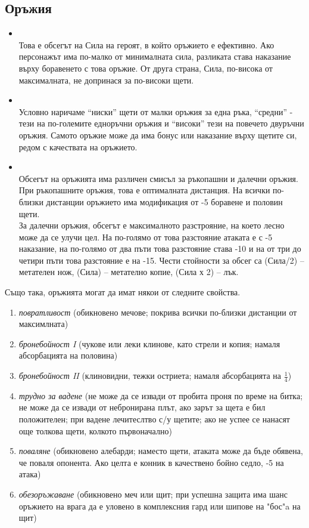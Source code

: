 \subsection{Оръжия}
\begin{itemize}
\item {} \\
Това е обсегът на Сила на героят, в който оръжието е ефективно.
Ако персонажът има по-малко от минималната сила, разликата става наказание върху боравенето с това оръжие.
От друга страна, Сила, по-висока от максималната, не допринася за по-високи щети.
\item {} \\
Условно наричаме “ниски” щети от малки оръжия за една ръка, “средни” - тези на по-големите
едноръчни оръжия и “високи” тези на повечето двуръчни оръжия.
Самото оръжие може да има бонус или наказание върху щетите си, редом с качествата на оръжието.
\item {} \\
Обсегът на оръжията има различен смисъл за ръкопашни и далечни оръжия.
При ръкопашните оръжия, това е оптималната дистанция.
На всички по-близки дистанции оръжието има модификация от -5 боравене и половин щети.
\\
За далечни оръжия, обсегът е максималното разстрояние, на което лесно може да се улучи цел.
На по-голямо от това разстояние атаката е с -5 наказание, на по-голямо от два пъти това разстояние става -10 и на от три до четири пъти това разстояние е на -15.
Чести стойности за обсег са (Сила/2) – метателен нож, (Сила) – метателно копие, (Сила х 2) – лък.
\end{itemize}

Също така, оръжията могат да имат някои от следните свойства.
\begin{enumerate}
\item{\textit{повратливост} (обикновено мечове; покрива всички по-близки дистанции от максимлната)}
\item{\textit{бронебойност I} (чукове или леки клинове, като стрели и копия; намаля абсорбацията на половина)}
\item{\textit{бронебойност II} (клиновидни, тежки остриета; намаля абсорбацията на $\frac1 4$)}
\item{\textit{трудно за вадене} (не може да се извади от пробита проня по време на битка; не може да се извади от небронирана плът, ако зарът за щета е бил положителен; при вадене лечитеслтво с/у щетите; ако не успее се  нанасят още толкова щети, колкото първоначално)}
\item{\textit{поваляне} (обикновено алебарди; наместо щети, атаката може да бъде обявена, че поваля опонента. Ако целта е конник в качествено бойно седло, -5 на атака)}
\item{\textit{обезоръжаване} (обикновено меч или щит; при успешна защита има шанс оръжието на врага да е уловено в комплексния гард или шипове на "бос"a на щит)}
\end{enumerate}

